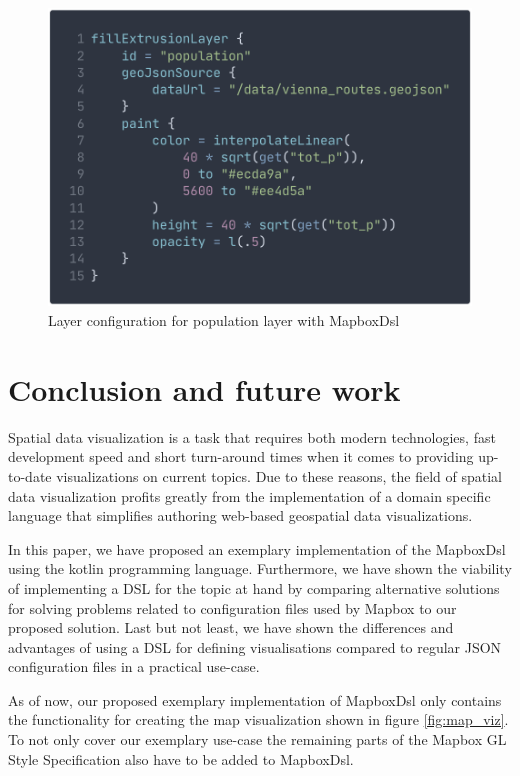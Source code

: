 \documentclass[conference]{IEEEtran}
\begin{document}
\begin{figure}
    \centering
    \includegraphics[width=\columnwidth]{img/vienna-dsl.png}
    \caption{Layer configuration for population layer with MapboxDsl}
    \label{fig:dsl-config}
\end{figure}

\section{Conclusion and future work}

Spatial data visualization is a task that requires both modern technologies, fast development speed and short turn-around times when it comes to providing up-to-date visualizations on current topics. Due to these reasons, the field of spatial data visualization profits greatly from the implementation of a domain specific language that simplifies authoring web-based geospatial data visualizations.

In this paper, we have proposed an exemplary implementation of the MapboxDsl using the kotlin programming language. Furthermore, we have shown the viability of implementing a DSL for the topic at hand by comparing alternative solutions for solving problems related to configuration files used by Mapbox to our proposed solution. Last but not least, we have shown the differences and advantages of using a DSL for defining visualisations compared to regular JSON configuration files in a practical use-case.

As of now, our proposed exemplary implementation of MapboxDsl only contains the functionality for creating the map visualization shown in figure \ref{fig:map_viz}. To not only cover our exemplary use-case the remaining parts of the Mapbox GL Style Specification also have to be added to MapboxDsl. 
\end{document}
